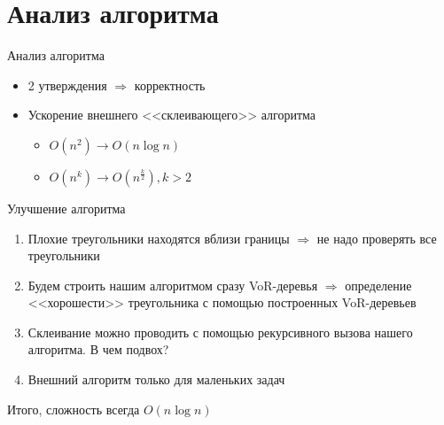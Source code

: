 \documentclass[14pt, fleqn, xcolor={dvipsnames, table}]{beamer}
\begin{document}
    \section{Анализ алгоритма} 
        
        \begin{frame}{Анализ алгоритма}
            \begin{itemize}
                \item 2 утверждения $\Longrightarrow$ корректность
                \item Ускорение внешнего <<склеивающего>> алгоритма
                \begin{itemize}
                    \item $O(n^2) \longrightarrow O(n \log n)$
                    \item $O(n^k) \longrightarrow O(n^\frac{k}{2}), k > 2$
                \end{itemize}
            \end{itemize}
            
        \end{frame}
        
        \begin{frame}{Улучшение алгоритма}
            \begin{enumerate}
                \item Плохие треугольники находятся вблизи границы $\Longrightarrow$ не надо проверять все треугольники
                \item Будем строить нашим алгоритмом сразу VoR-деревья  $\Longrightarrow$ определение <<хорошести>> треугольника с помощью построенных VoR-деревьев
                \item Склеивание можно проводить с помощью рекурсивного вызова нашего алгоритма. В чем подвох?
                \item Внешний алгоритм только для маленьких задач  
            \end{enumerate}
            Итого, сложность всегда $O(n \log n)$
        \end{frame}
        
\end{document}
